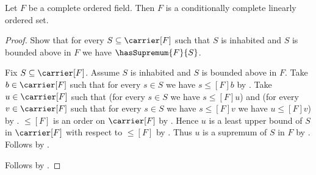 \begin{theorem}\label{complete_ordered_field_is_conditionally_complete}
    Let $F$ be a complete ordered field.
    Then $F$ is a conditionally complete linearly ordered set.
\end{theorem}
\begin{proof}
    Show that for every $S\subseteq\carrier[F]$ such that
        $S$ is inhabited and $S$ is bounded above in $F$ we have
        $\hasSupremum{F}{S}$.
    \begin{subproof}
        Fix $S\subseteq\carrier[F]$.
        Assume $S$ is inhabited and $S$ is bounded above in $F$.
        Take $b\in\carrier[F]$ such that for every $s\in S$ we have
            $s\mathrel{\leq[F]}b$ by
            .
        Take $u\in\carrier[F]$ such that
            (for every $s\in S$ we have $s\mathrel{\leq[F]}u$) and
            (for every $v\in\carrier[F]$ such that for every $s\in S$
                we have $s\mathrel{\leq[F]}v$ we have
                $u\mathrel{\leq[F]}v$) by
            .
        $\leq[F]$ is an order on $\carrier[F]$ by
            .
        Hence $u$ is a least upper bound of $S$ in $\carrier[F]$
            with respect to $\leq[F]$ by
            .
        Thus $u$ is a supremum of $S$ in $F$ by
            .
        Follows by .
    \end{subproof}
    Follows by .
\end{proof}
